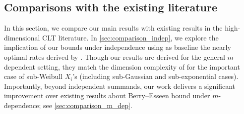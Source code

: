 \documentclass[aos]{imsart}
\begin{document}
\subsection{Comparisons with the existing literature} \label{sec:comparison}


In this section, we compare our main results with existing results in the high-dimensional CLT literature. In \cref{sec:comparison_indep}, we explore the implication of our bounds under independence using as baseline the nearly optimal rates derived by . 
Though our results are derived for the general $m$-dependent setting, they match the dimension complexity of  for the important case of sub-Weibull $X_i$'s (including sub-Gaussian and sub-exponential cases).
Importantly, beyond independent summands, our work delivers a significant improvement over existing results about Berry--Esseen bound under $m$-dependence; see \cref{sec:comparison_m_dep}.
\end{document}
